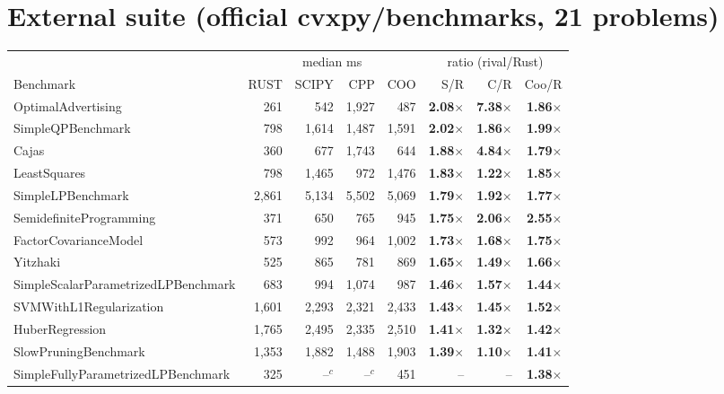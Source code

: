 \documentclass[11pt]{article}
\begin{document}
\section{External suite (official cvxpy/benchmarks, 21 problems)}
\begin{table}[h]\centering\small
\begin{tabular}{lrrrrrrr}
\toprule
 & \multicolumn{4}{c}{median ms} & \multicolumn{3}{c}{ratio (rival/Rust)} \\
\cmidrule(lr){2-5}\cmidrule(lr){6-8}
Benchmark & RUST & SCIPY & CPP & COO & S/R & C/R & Coo/R \\
\midrule
OptimalAdvertising & 261 & 542 & 1,927 & 487 & \textbf{2.08$\times$} & \textbf{7.38$\times$} & \textbf{1.86$\times$} \\
SimpleQPBenchmark & 798 & 1,614 & 1,487 & 1,591 & \textbf{2.02$\times$} & \textbf{1.86$\times$} & \textbf{1.99$\times$} \\
Cajas & 360 & 677 & 1,743 & 644 & \textbf{1.88$\times$} & \textbf{4.84$\times$} & \textbf{1.79$\times$} \\
LeastSquares & 798 & 1,465 & 972 & 1,476 & \textbf{1.83$\times$} & \textbf{1.22$\times$} & \textbf{1.85$\times$} \\
SimpleLPBenchmark & 2,861 & 5,134 & 5,502 & 5,069 & \textbf{1.79$\times$} & \textbf{1.92$\times$} & \textbf{1.77$\times$} \\
SemidefiniteProgramming & 371 & 650 & 765 & 945 & \textbf{1.75$\times$} & \textbf{2.06$\times$} & \textbf{2.55$\times$} \\
FactorCovarianceModel & 573 & 992 & 964 & 1,002 & \textbf{1.73$\times$} & \textbf{1.68$\times$} & \textbf{1.75$\times$} \\
Yitzhaki & 525 & 865 & 781 & 869 & \textbf{1.65$\times$} & \textbf{1.49$\times$} & \textbf{1.66$\times$} \\
SimpleScalarParametrizedLPBenchmark & 683 & 994 & 1,074 & 987 & \textbf{1.46$\times$} & \textbf{1.57$\times$} & \textbf{1.44$\times$} \\
SVMWithL1Regularization & 1,601 & 2,293 & 2,321 & 2,433 & \textbf{1.43$\times$} & \textbf{1.45$\times$} & \textbf{1.52$\times$} \\
HuberRegression & 1,765 & 2,495 & 2,335 & 2,510 & \textbf{1.41$\times$} & \textbf{1.32$\times$} & \textbf{1.42$\times$} \\
SlowPruningBenchmark & 1,353 & 1,882 & 1,488 & 1,903 & \textbf{1.39$\times$} & \textbf{1.10$\times$} & \textbf{1.41$\times$} \\
SimpleFullyParametrizedLPBenchmark & 325 & --$^{c}$ & --$^{c}$ & 451 & -- & -- & \textbf{1.38$\times$} \\

\end{tabular}
\end{table}
\end{document}
